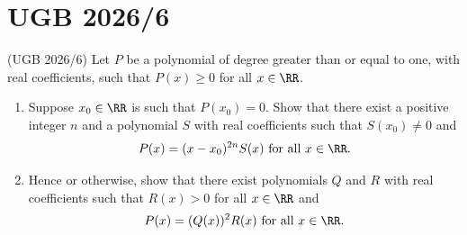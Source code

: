 \documentclass[numbers=endperiod, 11pt]{scrartcl}
\begin{document}
\section{UGB 2026/6}

\begin{prob}{(UGB 2026/6)}{}
    Let $P$ be a polynomial of degree greater than or
    equal to one, with real coefficients, such that
    $P(x) \geq 0$ for all $x \in \RR$.
    \begin{enumerate}[label=\alph*)]
        \item Suppose $x_0 \in \RR$ is such that
              $P(x_0) = 0$. Show that there exist a
              positive integer $n$ and a polynomial
              $S$ with real coefficients such that
              $S(x_0) \neq 0$ and
              \[P(x) = (x - x_0)^{2n} S(x) \text{ for all } x \in \RR.\]
        \item Hence or otherwise, show that there
              exist polynomials $Q$ and $R$ with real
              coefficients such that $R(x) > 0$ for
              all $x \in \RR$ and
              \[P(x) = (Q(x))^2 R(x) \text{ for all } x \in \RR.\]
    \end{enumerate}
\end{prob}
\end{document}

